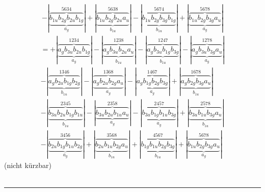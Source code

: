 \documentclass{article}
\begin{document}
\begin{multline*}
-\left|\underbrace{\overbrace{b_{1u} b_{2g} b_{2u} b_{1g}}^{5 6 3 4}}_{a_{g}}\right|+\left|\underbrace{\overbrace{b_{1u} b_{2g} b_{2u} a_{u}}^{5 6 3 8}}_{b_{1u}}\right|-\left|\underbrace{\overbrace{b_{1u} b_{2g} b_{3g} b_{1g}}^{5 6 7 4}}_{b_{1u}}\right|+\left|\underbrace{\overbrace{b_{1u} b_{2g} b_{3g} a_{u}}^{5 6 7 8}}_{a_{g}}\right|
\end{multline*}\begin{multline*}
=+\left|\underbrace{\overbrace{a_{g} b_{3u} b_{2u} b_{1g}}^{1 2 3 4}}_{a_{g}}\right|-\left|\underbrace{\overbrace{a_{g} b_{3u} b_{2u} a_{u}}^{1 2 3 8}}_{b_{1u}}\right|-\left|\underbrace{\overbrace{a_{g} b_{3u} b_{1g} b_{3g}}^{1 2 4 7}}_{b_{1u}}\right|-\left|\underbrace{\overbrace{a_{g} b_{3u} b_{3g} a_{u}}^{1 2 7 8}}_{a_{g}}\right|\\
-\left|\underbrace{\overbrace{a_{g} b_{2u} b_{1g} b_{2g}}^{1 3 4 6}}_{b_{1u}}\right|-\left|\underbrace{\overbrace{a_{g} b_{2u} b_{2g} a_{u}}^{1 3 6 8}}_{a_{g}}\right|-\left|\underbrace{\overbrace{a_{g} b_{1g} b_{2g} b_{3g}}^{1 4 6 7}}_{a_{g}}\right|+\left|\underbrace{\overbrace{a_{g} b_{2g} b_{3g} a_{u}}^{1 6 7 8}}_{b_{1u}}\right|\\
-\left|\underbrace{\overbrace{b_{3u} b_{2u} b_{1g} b_{1u}}^{2 3 4 5}}_{b_{1u}}\right|-\left|\underbrace{\overbrace{b_{3u} b_{2u} b_{1u} a_{u}}^{2 3 5 8}}_{a_{g}}\right|-\left|\underbrace{\overbrace{b_{3u} b_{1g} b_{1u} b_{3g}}^{2 4 5 7}}_{a_{g}}\right|+\left|\underbrace{\overbrace{b_{3u} b_{1u} b_{3g} a_{u}}^{2 5 7 8}}_{b_{1u}}\right|\\
-\left|\underbrace{\overbrace{b_{2u} b_{1g} b_{1u} b_{2g}}^{3 4 5 6}}_{a_{g}}\right|+\left|\underbrace{\overbrace{b_{2u} b_{1u} b_{2g} a_{u}}^{3 5 6 8}}_{b_{1u}}\right|+\left|\underbrace{\overbrace{b_{1g} b_{1u} b_{2g} b_{3g}}^{4 5 6 7}}_{b_{1u}}\right|+\left|\underbrace{\overbrace{b_{1u} b_{2g} b_{3g} a_{u}}^{5 6 7 8}}_{a_{g}}\right|
\end{multline*}(nicht kürzbar)\\ \\
\hrule\newpage 
\end{document}
